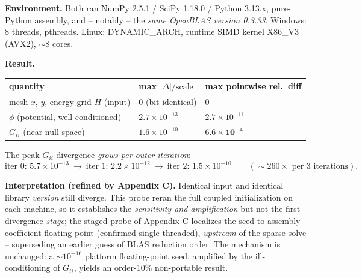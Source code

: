 \documentclass[11pt]{article}
\newcommand{\ten}[1]{\times 10^{#1}}
\begin{document}
\textbf{Environment.} Both ran NumPy 2.5.1 / SciPy 1.18.0 / Python 3.13.x, pure-Python assembly, and -- notably -- the \emph{same OpenBLAS version 0.3.33}. Windows: 8 threads, pthreads. Linux: DYNAMIC\_ARCH, runtime SIMD kernel X86\_V3 (AVX2), $\sim$8 cores.

\textbf{Result.}
\begin{center}\small
\begin{tabular}{l l l}
\toprule
quantity & max $|\Delta|/\mathrm{scale}$ & max pointwise rel.\ diff \\
\midrule
mesh $x$, $y$, energy grid $H$ (input) & $0$ (bit-identical) & $0$ \\
$\phi$ (potential, well-conditioned) & $2.7\ten{-13}$ & $2.7\ten{-11}$ \\
$G_{ii}$ (near-null-space) & $1.6\ten{-10}$ & $\mathbf{6.6\ten{-4}}$ \\
\bottomrule
\end{tabular}
\end{center}
The peak-$G_{ii}$ divergence \emph{grows per outer iteration}:
\[
\text{iter 0: } 5.7\ten{-13}\ \to\ \text{iter 1: } 2.2\ten{-12}\ \to\ \text{iter 2: } 1.5\ten{-10}\qquad(\sim\!260\times\text{ per 3 iterations}).
\]

\textbf{Interpretation (refined by Appendix C).} Identical input and identical library \emph{version} still diverge. This probe reran the full coupled initialization on each machine, so it establishes the \emph{sensitivity and amplification} but not the first-divergence \emph{stage}; the staged probe of Appendix C localizes the seed to assembly-coefficient floating point (confirmed single-threaded), \emph{upstream} of the sparse solve -- superseding an earlier guess of BLAS reduction order. The mechanism is unchanged: a $\sim10^{-16}$ platform floating-point seed, amplified by the ill-conditioning of $G_{ii}$, yields an order-10\% non-portable result.
\end{document}
